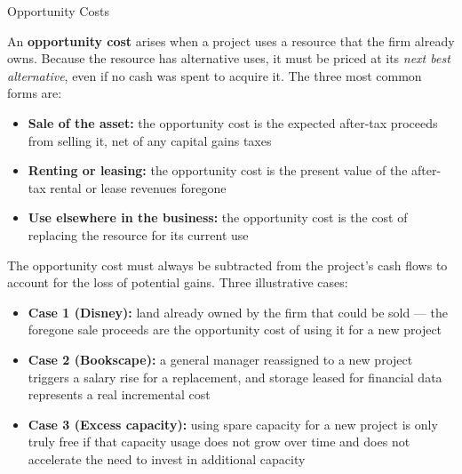 \documentclass[10pt]{article}
\begin{document}
    \begin{core}{Opportunity Costs}

      An \textbf{opportunity cost} arises when a project uses a resource that the firm already owns. Because the resource has alternative uses, it must be priced at its \textit{next best alternative}, even if no cash was spent to acquire it. The three most common forms are:

      \begin{itemize}

        \item \textbf{Sale of the asset:} the opportunity cost is the expected after-tax proceeds from selling it, net of any capital gains taxes

        \item \textbf{Renting or leasing:} the opportunity cost is the present value of the after-tax rental or lease revenues foregone

        \item \textbf{Use elsewhere in the business:} the opportunity cost is the cost of replacing the resource for its current use

      \end{itemize}

      The opportunity cost must always be subtracted from the project's cash flows to account for the loss of potential gains. Three illustrative cases:

      \begin{itemize}

        \item \textbf{Case 1 (Disney):} land already owned by the firm that could be sold — the foregone sale proceeds are the opportunity cost of using it for a new project

        \item \textbf{Case 2 (Bookscape):} a general manager reassigned to a new project triggers a salary rise for a replacement, and storage leased for financial data represents a real incremental cost

        \item \textbf{Case 3 (Excess capacity):} using spare capacity for a new project is only truly free if that capacity usage does not grow over time and does not accelerate the need to invest in additional capacity

      \end{itemize}


\end{core}
\end{document}
